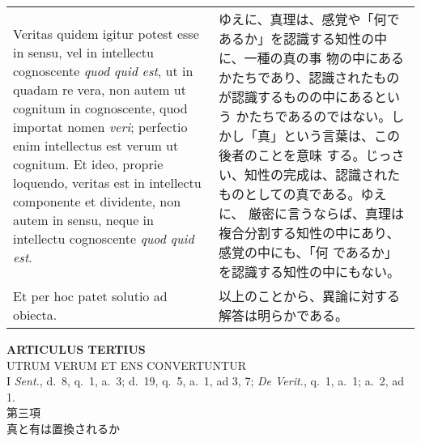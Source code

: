 \documentclass[10pt]{jsarticle} %
\begin{document}
\begin{longtable}{p{21em}p{21em}}
\\

Veritas quidem igitur potest esse in sensu, vel in intellectu
cognoscente {\itshape quod quid est}, ut in quadam re vera, non autem
ut cognitum in cognoscente, quod importat nomen {\itshape veri};
perfectio enim intellectus est verum ut cognitum. Et ideo, proprie
loquendo, veritas est in intellectu componente et dividente, non autem
in sensu, neque in intellectu cognoscente {\itshape quod quid est}.

&

ゆえに、真理は、感覚や「何であるか」を認識する知性の中に、一種の真の事
物の中にあるかたちであり、認識されたものが認識するものの中にあるという
かたちであるのではない。しかし「真」という言葉は、この後者のことを意味
する。じっさい、知性の完成は、認識されたものとしての真である。ゆえに、
厳密に言うならば、真理は複合分割する知性の中にあり、感覚の中にも、「何
であるか」を認識する知性の中にもない。

\\

Et per hoc patet solutio ad obiecta.

&

以上のことから、異論に対する解答は明らかである。

\end{longtable}
\newpage

\begin{center}
 {\Large {\bf ARTICULUS TERTIUS}}\\
 {\large UTRUM VERUM ET ENS CONVERTUNTUR}\\
 {\footnotesize I {\itshape Sent.}, d.~8, q.~1, a.~3; d.~19, q.~5, a.~1,
 ad 3, 7; {\itshape De Verit.}, q.~1, a.~1; a.~2, ad 1.}\\
 {\Large 第三項\\真と有は置換されるか}
\end{center}
\end{document}
